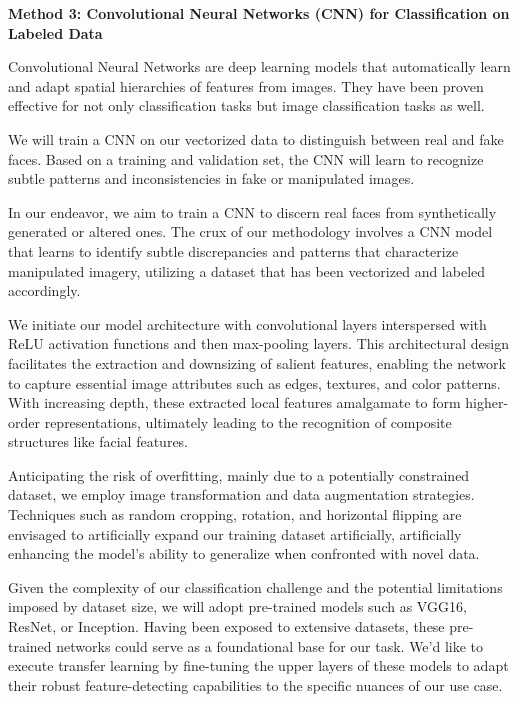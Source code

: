 \documentclass{article}
\begin{document}
\begin{titlepage}
\begin{itemize}
\newpage

    \textbf{Method 3: Convolutional Neural Networks (CNN) for Classification on Labeled Data}

    Convolutional Neural Networks are deep learning models that automatically learn and adapt spatial hierarchies of features from images. They have been proven effective for not only classification tasks but image classification tasks as well.

    We will train a CNN on our vectorized data to distinguish between real and fake faces. Based on a training and validation set, the CNN will learn to recognize subtle patterns and inconsistencies in fake or manipulated images.

    In our endeavor, we aim to train a CNN to discern real faces from synthetically generated or altered ones. The crux of our methodology involves a CNN model that learns to identify subtle discrepancies and patterns that characterize manipulated imagery, utilizing a dataset that has been vectorized and labeled accordingly.

    We initiate our model architecture with convolutional layers interspersed with ReLU activation functions and then max-pooling layers. This architectural design facilitates the extraction and downsizing of salient features, enabling the network to capture essential image attributes such as edges, textures, and color patterns. With increasing depth, these extracted local features amalgamate to form higher-order representations, ultimately leading to the recognition of composite structures like facial features.

    Anticipating the risk of overfitting, mainly due to a potentially constrained dataset, we employ image transformation and data augmentation strategies. Techniques such as random cropping, rotation, and horizontal flipping are envisaged to artificially expand our training dataset artificially, artificially enhancing the model's ability to generalize when confronted with novel data.

    Given the complexity of our classification challenge and the potential limitations imposed by dataset size, we will adopt pre-trained models such as VGG16, ResNet, or Inception. Having been exposed to extensive datasets, these pre-trained networks could serve as a foundational base for our task. We'd like to execute transfer learning by fine-tuning the upper layers of these models to adapt their robust feature-detecting capabilities to the specific nuances of our use case.


\end{itemize}
\end{titlepage}
\end{document}
